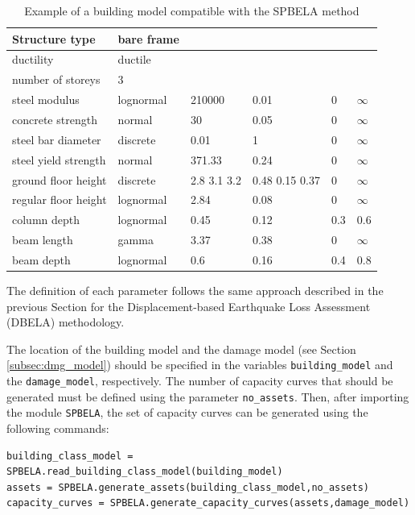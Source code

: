 \begin {table}[htb]
\caption{Example of a building model compatible with the SPBELA method}
\label{table:building_model}
\begin{center}
  \begin{tabular}{ | l | l | l | l | l | l |}
  \hline
Structure type & bare frame &  &  &  &  \\ \hline
ductility & ductile &  &  &  &  \\ \hline
number of storeys & 3 &  &  &  &  \\ \hline
steel modulus & lognormal & 210000 & 0.01 & 0 & $\infty$ \\ \hline
concrete strength & normal & 30 & 0.05 & 0 & $\infty$ \\ \hline
steel bar diameter & discrete & 0.01 & 1 & 0 & $\infty$ \\ \hline
steel yield strength & normal & 371.33 & 0.24 & 0 & $\infty$ \\ \hline
ground floor height & discrete & 2.8 3.1 3.2 & 0.48 0.15 0.37 & 0 & $\infty$ \\ \hline
regular floor height & lognormal & 2.84 & 0.08 & 0 & $\infty$ \\ \hline
column depth & lognormal & 0.45 & 0.12 & 0.3 & 0.6 \\ \hline
beam length & gamma & 3.37 & 0.38 & 0 & $\infty$ \\ \hline
beam depth & lognormal & 0.6 & 0.16 & 0.4 & 0.8 \\ \hline
  \end{tabular}
\end{center}
\end{table}

The definition of each parameter follows the same approach described in the previous Section for the Displacement-based Earthquake Loss Assessment (DBELA) methodology.

The location of the building model and the damage model (see Section \ref{subsec:dmg_model}) should be specified in the variables \verb=building_model= and the \verb=damage_model=, respectively. The number of capacity curves that should be generated must be defined using the parameter \verb=no_assets=. Then, after importing the module \verb=SPBELA=, the set of capacity curves can be generated using the following commands:

\begin{Verbatim}[frame=single, commandchars=\\\{\}, samepage=true]
building_class_model = SPBELA.read_building_class_model(building_model)
assets = SPBELA.generate_assets(building_class_model,no_assets)
capacity_curves = SPBELA.generate_capacity_curves(assets,damage_model)
\end{Verbatim}

